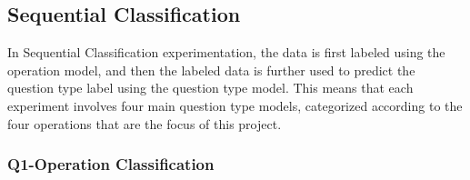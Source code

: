 \documentclass[12pt,oneside,openright,a4paper]{cpe-english-project}
\begin{document}
    \subsection{Sequential Classification}
      \qquad In Sequential Classification experimentation, the data is first labeled using the operation model, and then the labeled data is further used to predict the question type label using the question type model. This means that each experiment involves four main question type models, categorized according to the four operations that are the focus of this project. \par
      \subsubsection{Q1-Operation Classification}
        \begin{table}[H]
          \scriptsize
          \centering
          \caption{Q1-Operation Classification (\textthai{ถอนฟัน}) Result}\label{tab:Q1-Operation.1}
\end{table}
\end{document}
